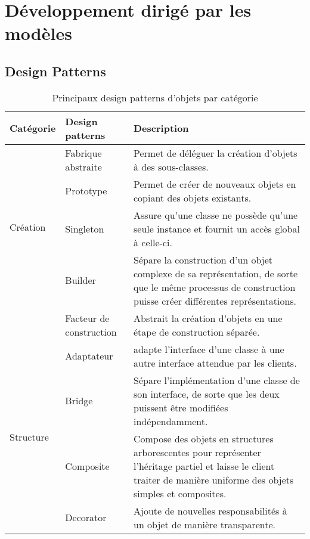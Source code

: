 \chapter{D\'eveloppement dirig\'e par les mod\`eles}\label{chap:dev}

\section{Design Patterns}\label{sec:designpatterns}
\begin{minipage}[t]{1\textwidth}
\begin{definition}
\end{definition}
\begin{table}[H]
\caption{Principaux design patterns d'objets par catégorie}
\label{tbl:design_patterns}
\begin{adjustbox}{max width=\textwidth}
\begin{tabular}{l|p{14em}|p{30em}}
\toprule
\textbf{Catégorie} & \textbf{Design patterns} & \textbf{Description} \\
\midrule
\multirow{4}{*}{Création} & Fabrique abstraite & Permet de déléguer la création d'objets à des sous-classes.\\
\cmidrule(lr){2-3}
& Prototype & Permet de créer de nouveaux objets en copiant des objets existants.\\
\cmidrule(lr){2-3}
& Singleton & Assure qu'une classe ne possède qu'une seule instance et fournit un accès global à celle-ci.\\
\cmidrule(lr){2-3}
& Builder & Sépare la construction d'un objet complexe de sa représentation, de sorte que le même processus de construction puisse créer différentes représentations.\\
\cmidrule(lr){2-3}
& Facteur de construction & Abstrait la création d'objets en une étape de construction séparée.\\
\midrule
\multirow{7}{*}{Structure} & Adaptateur & adapte l'interface d'une classe à une autre interface attendue par les clients.\\
\cmidrule(lr){2-3}
& Bridge & Sépare l'implémentation d'une classe de son interface, de sorte que les deux puissent être modifiées indépendamment.\\
\cmidrule(lr){2-3}
& Composite & Compose des objets en structures arborescentes pour représenter l'héritage partiel et laisse le client traiter de manière uniforme des objets simples et composites.\\
\cmidrule(lr){2-3}
& Decorator & Ajoute de nouvelles responsabilités à un objet de manière transparente.\\

\end{tabular}
\end{adjustbox}
\end{table}
\end{minipage}

